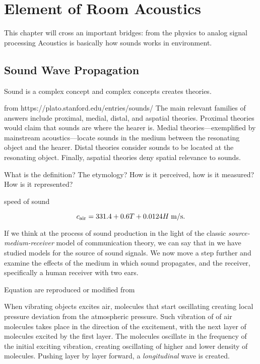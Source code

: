 \chapter{Element of Room Acoustics}\label{chap:acoustics}

 This chapter will cross an important bridges: from the physics to analog signal processing
Acoustics is basically how sounds works in environment.


\section{Sound Wave Propagation}

Sound is a complex concept and complex concepts creates theories.


from https://plato.stanford.edu/entries/sounds/
The main relevant families of answers include proximal, medial, distal, and aspatial theories.
Proximal theories would claim that sounds are where the hearer is.
Medial theories—exemplified by mainstream acoustics—locate sounds in the medium between the resonating object and the hearer.
Distal theories consider sounds to be located at the resonating object. Finally, aspatial theories deny spatial relevance to sounds.

What is the definition? The etymology?
How is it perceived, how is it measured? How is it represented?

speed of sound

\begin{equation}
    c_\text{air} =  331.4 + 0.6T + 0.0124H \; \text{m/s}
    .
\end{equation}


If we think at the process of sound production in the light of the classic \textit{source-medium-receiver} model of communication theory,
we can say that in we have studied models for the source of sound signals. We now move a step further and examine the effects of the medium in which sound propagates, and the receiver, specifically a human receiver with two ears.

Equation are reproduced or modified from \cite{Kuttruff2009room, Marczuk2006modelling, Habets2010generator, Avanzini2019Chapter4, Allen1999image}

When vibrating objects excites air, molecules that start oscillating creating local pressure deviation from the atmospheric pressure.
Such vibration of of air molecules takes place in the direction of the excitement, with the next layer of molecules excited by the first layer.
The molecules oscillate in the frequency of the initial exciting vibration, creating oscillating of higher and lower density of molecules.
Pushing layer by layer forward, a \textit{longitudinal} wave is created.

